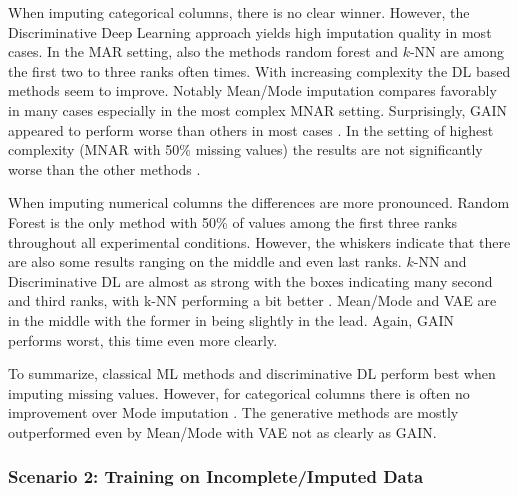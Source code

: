 When imputing categorical columns, there is no clear winner. However, the Discriminative Deep Learning approach yields high imputation quality in most cases. In the MAR setting, also the methods random forest and $k$-NN are among the first two to three ranks often times. With increasing complexity the DL based methods seem to improve. Notably Mean/Mode imputation compares favorably in many cases especially in the most complex MNAR setting. Surprisingly, GAIN appeared to perform worse than others in most cases . In the setting of highest complexity (MNAR with 50\% missing values) the results are not significantly worse than the other methods .

When imputing numerical columns the differences are more pronounced. Random Forest is the only method with 50\% of values among the first three ranks throughout all experimental conditions. However, the whiskers indicate that there are also some results ranging on the middle and even last ranks. $k$-NN and Discriminative DL are almost as strong with the boxes indicating many second and third ranks, with k-NN performing a bit better . Mean/Mode and VAE are in the middle with the former in being slightly in the lead.  Again, GAIN performs worst, this time even more clearly.

To summarize, classical ML methods and discriminative DL perform best when imputing missing values. However, for categorical columns there is often no improvement over Mode imputation . The generative methods are mostly outperformed even by Mean/Mode with VAE not as clearly as GAIN.


\subsubsection{Scenario 2: Training on Incomplete/Imputed Data}



